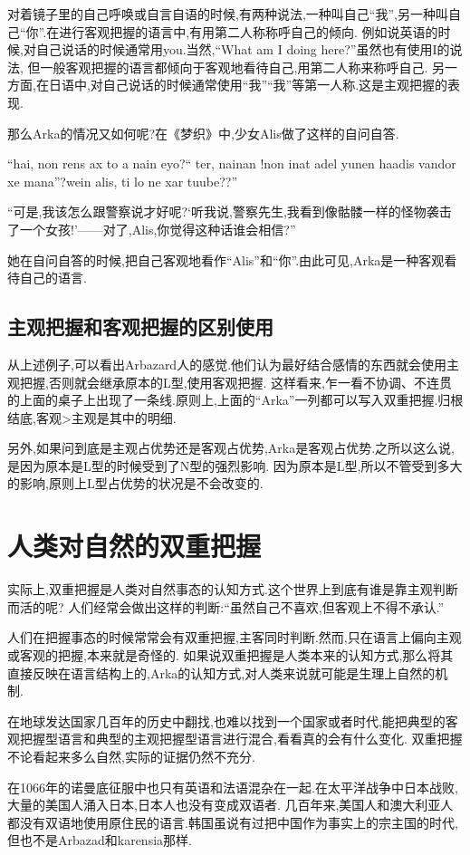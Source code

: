 对着镜子里的自己呼唤或自言自语的时候,有两种说法,一种叫自己``我'',另一种叫自己``你''.在进行客观把握的语言中,有用第二人称称呼自己的倾向.
例如说英语的时候,对自己说话的时候通常用you.当然,``What am I doing here?''虽然也有使用I的说法,
但一般客观把握的语言都倾向于客观地看待自己,用第二人称来称呼自己.
另一方面,在日语中,对自己说话的时候通常使用``我''``我''等第一人称.这是主观把握的表现.

那么Arka的情况又如何呢?在《梦织》中,少女Alis做了这样的自问自答.
{\kaishu 
``hai, non rens ax to a nain eyo?`` ter, nainan !non inat adel yunen haadis vandor xe mana''?wein alis, ti lo ne xar tuube??''

``可是,我该怎么跟警察说才好呢?‘听我说,警察先生,我看到像骷髅一样的怪物袭击了一个女孩!’——对了,Alis,你觉得这种话谁会相信?''
}

她在自问自答的时候,把自己客观地看作``Alis''和``你''.由此可见,Arka是一种客观看待自己的语言.


\subsection{主观把握和客观把握的区别使用}
从上述例子,可以看出Arbazard人的感觉.他们认为最好结合感情的东西就会使用主观把握,否则就会继承原本的L型,使用客观把握.
这样看来,乍一看不协调、不连贯的上面的桌子上出现了一条线.原则上,上面的``Arka''一列都可以写入双重把握.归根结底,客观>主观是其中的明细.

另外,如果问到底是主观占优势还是客观占优势,Arka是客观占优势.之所以这么说,是因为原本是L型的时候受到了N型的强烈影响.
因为原本是L型,所以不管受到多大的影响,原则上L型占优势的状况是不会改变的.


\section{人类对自然的双重把握}
实际上,双重把握是人类对自然事态的认知方式.这个世界上到底有谁是靠主观判断而活的呢?
人们经常会做出这样的判断:``虽然自己不喜欢,但客观上不得不承认.''

人们在把握事态的时候常常会有双重把握,主客同时判断.然而,只在语言上偏向主观或客观的把握,本来就是奇怪的.
如果说双重把握是人类本来的认知方式,那么将其直接反映在语言结构上的,Arka的认知方式,对人类来说就可能是生理上自然的机制.

在地球发达国家几百年的历史中翻找,也难以找到一个国家或者时代,能把典型的客观把握型语言和典型的主观把握型语言进行混合,看看真的会有什么变化.
双重把握不论看起来多么自然,实际的证据仍然不充分.

在1066年的诺曼底征服中也只有英语和法语混杂在一起.在太平洋战争中日本战败,大量的美国人涌入日本,日本人也没有变成双语者.
几百年来,美国人和澳大利亚人都没有双语地使用原住民的语言.韩国虽说有过把中国作为事实上的宗主国的时代,但也不是Arbazad和karensia那样.

